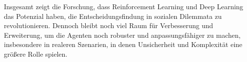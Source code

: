 Insgesamt zeigt die Forschung, dass Reinforcement Learning und Deep Learning das Potenzial haben, die Entscheidungsfindung in sozialen Dilemmata zu revolutionieren. Dennoch bleibt noch viel Raum für Verbesserung und Erweiterung, um die Agenten noch robuster und anpassungsfähiger zu machen, insbesondere in realeren Szenarien, in denen Unsicherheit und Komplexität eine größere Rolle spielen.
